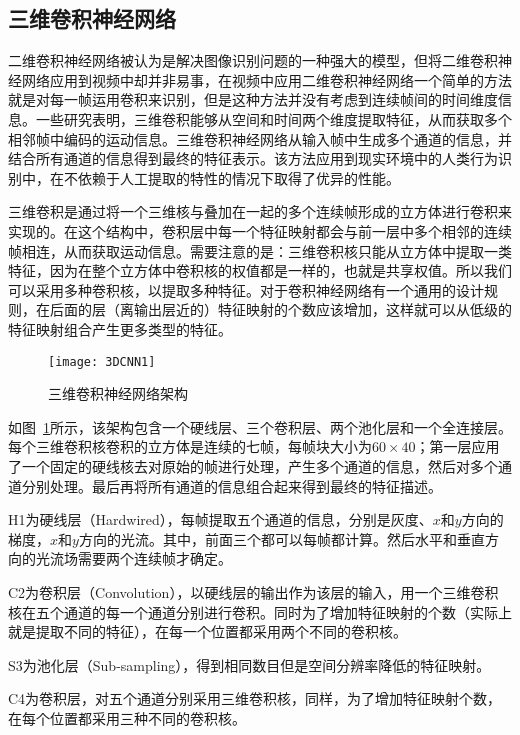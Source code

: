 \subsection{三维卷积神经网络}

二维卷积神经网络被认为是解决图像识别问题的一种强大的模型，但将二维卷积神经网络应用到视频中却并非易事，在视频中应用二维卷积神经网络一个简单的方法就是对每一帧运用卷积来识别，但是这种方法并没有考虑到连续帧间的时间维度信息。一些研究表明，三维卷积能够从空间和时间两个维度提取特征，从而获取多个相邻帧中编码的运动信息。三维卷积神经网络从输入帧中生成多个通道的信息，并结合所有通道的信息得到最终的特征表示。该方法应用到现实环境中的人类行为识别中，在不依赖于人工提取的特性的情况下取得了优异的性能\citep{Shuiwang20133D}。

三维卷积是通过将一个三维核与叠加在一起的多个连续帧形成的立方体进行卷积来实现的。在这个结构中，卷积层中每一个特征映射都会与前一层中多个相邻的连续帧相连，从而获取运动信息。需要注意的是：三维卷积核只能从立方体中提取一类特征，因为在整个立方体中卷积核的权值都是一样的，也就是共享权值。所以我们可以采用多种卷积核，以提取多种特征。对于卷积神经网络有一个通用的设计规则，在后面的层（离输出层近的）特征映射的个数应该增加，这样就可以从低级的特征映射组合产生更多类型的特征。

\begin{figure}[!htbp]
    \centering
    \texttt{[image: 3DCNN1]}
    \caption{三维卷积神经网络架构}
    \label{fig8}
\end{figure}

如图~\ref{fig8}所示，该架构包含一个硬线层、三个卷积层、两个池化层和一个全连接层。每个三维卷积核卷积的立方体是连续的七帧，每帧块大小为$60\times40$；第一层应用了一个固定的硬线核去对原始的帧进行处理，产生多个通道的信息，然后对多个通道分别处理。最后再将所有通道的信息组合起来得到最终的特征描述。

H1为硬线层（Hardwired），每帧提取五个通道的信息，分别是灰度、$x$和$y$方向的梯度，$x$和$y$方向的光流。其中，前面三个都可以每帧都计算。然后水平和垂直方向的光流场需要两个连续帧才确定。

C2为卷积层（Convolution），以硬线层的输出作为该层的输入，用一个三维卷积核在五个通道的每一个通道分别进行卷积。同时为了增加特征映射的个数（实际上就是提取不同的特征），在每一个位置都采用两个不同的卷积核。

S3为池化层（Sub-sampling），得到相同数目但是空间分辨率降低的特征映射。

C4为卷积层，对五个通道分别采用三维卷积核，同样，为了增加特征映射个数，在每个位置都采用三种不同的卷积核。

